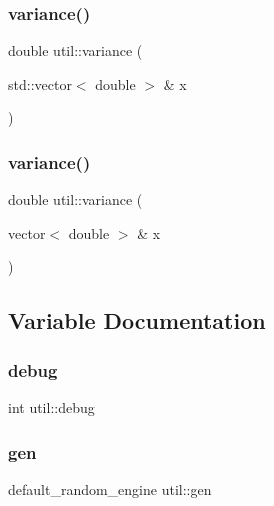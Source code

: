 \mbox{\label{namespaceutil_a2f9d2ca343c1e5fcbc1da5140de61f94}} 
\subsubsection{\texorpdfstring{variance()}{variance()}\hspace{0.1cm}{\footnotesize\ttfamily [1/2]}}
{\footnotesize\ttfamily double util\+::variance (\begin{DoxyParamCaption}\item[{std\+::vector$<$ double $>$ \&}]{x }\end{DoxyParamCaption})}

\mbox{\label{namespaceutil_a43a50c7b5c6674cd27461d91cfec686c}} 
\subsubsection{\texorpdfstring{variance()}{variance()}\hspace{0.1cm}{\footnotesize\ttfamily [2/2]}}
{\footnotesize\ttfamily double util\+::variance (\begin{DoxyParamCaption}\item[{vector$<$ double $>$ \&}]{x }\end{DoxyParamCaption})}



\subsection{Variable Documentation}
\mbox{\label{namespaceutil_aeda4e5339822ac6c9fb3f1991c126bfb}} 
\subsubsection{\texorpdfstring{debug}{debug}}
{\footnotesize\ttfamily int util\+::debug}

\mbox{\label{namespaceutil_ab30b96cc3fcd37942fb7f9f8a2e1898d}} 
\subsubsection{\texorpdfstring{gen}{gen}}
{\footnotesize\ttfamily default\+\_\+random\+\_\+engine util\+::gen}

